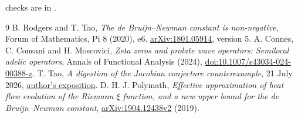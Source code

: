 \documentclass[11pt,a4paper]{article}
\theoremstyle{definition}
\theoremstyle{plain}
\begin{document}
checks are in .
\begin{thebibliography}{9}
 B. Rodgers and T. Tao,
\emph{The de Bruijn--Newman constant is non-negative},
Forum of Mathematics, Pi 8 (2020), e6.
\href{https://arxiv.org/abs/1801.05914}{arXiv:1801.05914}, version 5.
 A. Connes, C. Consani and H. Moscovici,
\emph{Zeta zeros and prolate wave operators: Semilocal adelic operators},
Annals of Functional Analysis (2024),
\href{https://doi.org/10.1007/s43034-024-00388-z}{doi:10.1007/s43034-024-00388-z}.
 T. Tao,
\emph{A digestion of the Jacobian conjecture counterexample},
21 July 2026,
\href{https://terrytao.wordpress.com/2026/07/21/a-digestion-of-the-jacobian-conjecture-counterexample/}{author's exposition}.
 D. H. J. Polymath,
\emph{Effective approximation of heat flow evolution of the Riemann
$\xi$ function, and a new upper bound for the de Bruijn--Newman constant},
\href{https://arxiv.org/abs/1904.12438v2}{arXiv:1904.12438v2} (2019).


\end{thebibliography}
\end{document}

